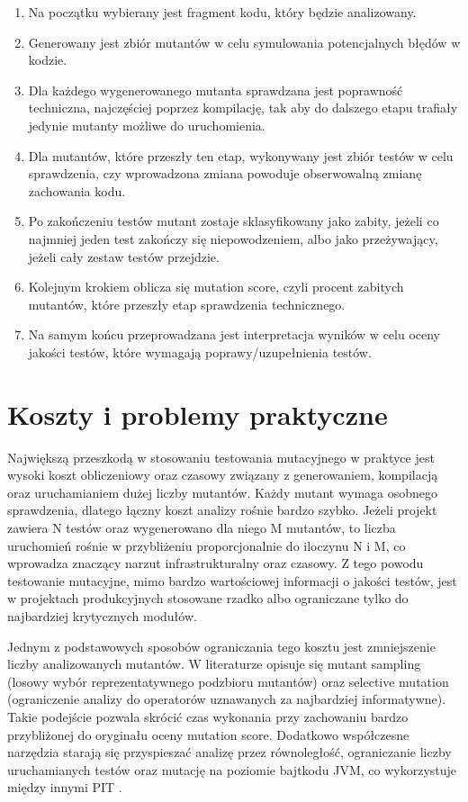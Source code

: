 \documentclass[12pt,a4paper,oldfontcommands]{memoir}
\theoremstyle{plain}
\theoremstyle{definition}
\theoremstyle{remark}
\begin{document}
    \begin{enumerate}
        \item Na początku wybierany jest fragment kodu, który będzie analizowany.
        \item Generowany jest zbiór mutantów w celu symulowania potencjalnych błędów w kodzie.
        \item Dla każdego wygenerowanego mutanta sprawdzana jest poprawność techniczna, najczęściej poprzez kompilację, tak aby do dalszego etapu trafiały jedynie mutanty możliwe do uruchomienia.
        \item Dla mutantów, które przeszły ten etap, wykonywany jest zbiór testów w celu sprawdzenia, czy wprowadzona zmiana powoduje obserwowalną zmianę zachowania kodu.
        \item Po zakończeniu testów mutant zostaje sklasyfikowany jako zabity, jeżeli co najmniej jeden test zakończy się niepowodzeniem, albo jako przeżywający, jeżeli cały zestaw testów przejdzie.
        \item Kolejnym krokiem oblicza się mutation score, czyli procent zabitych mutantów, które przeszły etap sprawdzenia technicznego.
        \item Na samym końcu przeprowadzana jest interpretacja wyników w celu oceny jakości testów, które wymagają poprawy/uzupełnienia testów.
    \end{enumerate}

    \section{Koszty i problemy praktyczne}

    Największą przeszkodą w stosowaniu testowania mutacyjnego w praktyce jest wysoki koszt obliczeniowy oraz czasowy związany z generowaniem, kompilacją oraz uruchamianiem dużej liczby mutantów.
    Każdy mutant wymaga osobnego sprawdzenia, dlatego łączny koszt analizy rośnie bardzo szybko.
    Jeżeli projekt zawiera N testów oraz wygenerowano dla niego M mutantów, to liczba uruchomień rośnie w przybliżeniu proporcjonalnie do iloczynu N i M, co wprowadza znaczący narzut infrastrukturalny oraz czasowy.
    Z tego powodu testowanie mutacyjne, mimo bardzo wartościowej informacji o jakości testów, jest w projektach produkcyjnych stosowane rzadko albo ograniczane tylko do najbardziej krytycznych modułów.

    Jednym z podstawowych sposobów ograniczania tego kosztu jest zmniejszenie liczby analizowanych mutantów.
    W literaturze \cite{ref4} opisuje się mutant sampling (losowy wybór reprezentatywnego podzbioru mutantów) oraz selective mutation (ograniczenie analizy do operatorów uznawanych za najbardziej informatywne).
    Takie podejście pozwala skrócić czas wykonania przy zachowaniu bardzo przybliżonej do oryginału oceny mutation score.
    Dodatkowo współczesne narzędzia starają się przyspieszać analizę przez równoległość, ograniczanie liczby uruchamianych testów oraz mutację na poziomie bajtkodu JVM, co wykorzystuje między innymi PIT \cite{ref1,ref2}.
\end{document}
